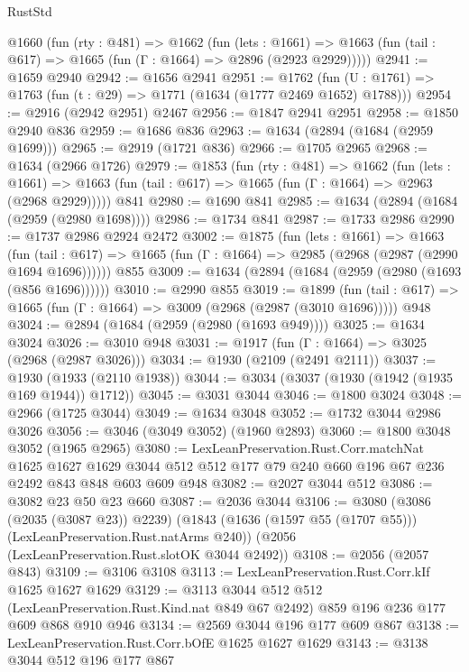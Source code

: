 \begin{lexlean}{RustStd}
\begin{coremodule}
  @1660
    (fun (rty : @481) =>
    @1662
      (fun (lets : @1661) =>
      @1663 (fun (tail : @617) => @1665 (fun (Γ : @1664) => @2896 (@2923 @2929)))))
@2941 := @1659 @2940
@2942 := @1656 @2941
@2951 := @1762 (fun (U : @1761) => @1763 (fun (t : @29) => @1771 (@1634 (@1777 @2469 @1652) @1788)))
@2954 := @2916 (@2942 @2951) @2467
@2956 := @1847 @2941 @2951
@2958 := @1850 @2940 @836
@2959 := @1686 @836
@2963 := @1634 (@2894 (@1684 (@2959 @1699)))
@2965 := @2919 (@1721 @836)
@2966 := @1705 @2965
@2968 := @1634 (@2966 @1726)
@2979 := @1853
    (fun (rty : @481) =>
    @1662
      (fun (lets : @1661) =>
      @1663 (fun (tail : @617) => @1665 (fun (Γ : @1664) => @2963 (@2968 @2929)))))
    @841
@2980 := @1690 @841
@2985 := @1634 (@2894 (@1684 (@2959 (@2980 @1698))))
@2986 := @1734 @841
@2987 := @1733 @2986
@2990 := @1737 @2986 @2924 @2472
@3002 := @1875
    (fun (lets : @1661) =>
    @1663
      (fun (tail : @617) => @1665 (fun (Γ : @1664) => @2985 (@2968 (@2987 (@2990 @1694 @1696))))))
    @855
@3009 := @1634 (@2894 (@1684 (@2959 (@2980 (@1693 (@856 @1696))))))
@3010 := @2990 @855
@3019 := @1899
    (fun (tail : @617) => @1665 (fun (Γ : @1664) => @3009 (@2968 (@2987 (@3010 @1696)))))
    @948
@3024 := @2894 (@1684 (@2959 (@2980 (@1693 @949))))
@3025 := @1634 @3024
@3026 := @3010 @948
@3031 := @1917 (fun (Γ : @1664) => @3025 (@2968 (@2987 @3026)))
@3034 := @1930 (@2109 (@2491 @2111))
@3037 := @1930 (@1933 (@2110 @1938))
@3044 := @3034 (@3037 (@1930 (@1942 (@1935 @169 @1944)) @1712))
@3045 := @3031 @3044
@3046 := @1800 @3024
@3048 := @2966 (@1725 @3044)
@3049 := @1634 @3048
@3052 := @1732 @3044 @2986 @3026
@3056 := @3046 (@3049 @3052) (@1960 @2893)
@3060 := @1800 @3048 @3052 (@1965 @2965)
@3080 := LexLeanPreservation.Rust.Corr.matchNat
    @1625
    @1627
    @1629
    @3044
    @512
    @512
    @177
    @79
    @240
    @660
    @196
    @67
    @236
    @2492
    @843
    @848
    @603
    @609
    @948
@3082 := @2027 @3044 @512
@3086 := @3082 @23 @50 @23 @660
@3087 := @2036 @3044
@3106 := @3080
    (@3086 (@2035 (@3087 @23)) @2239)
    (@1843 (@1636 (@1597 @55 (@1707 @55))) (LexLeanPreservation.Rust.natArms @240))
    (@2056 (LexLeanPreservation.Rust.slotOK @3044 @2492))
@3108 := @2056 (@2057 @843)
@3109 := @3106 @3108
@3113 := LexLeanPreservation.Rust.Corr.kIf @1625 @1627 @1629
@3129 := @3113
    @3044
    @512
    @512
    (LexLeanPreservation.Rust.Kind.nat @849 @67 @2492)
    @859
    @196
    @236
    @177
    @609
    @868
    @910
    @946
@3134 := @2569 @3044 @196 @177 @609 @867
@3138 := LexLeanPreservation.Rust.Corr.bOfE @1625 @1627 @1629
@3143 := @3138 @3044 @512 @196 @177 @867

\end{coremodule}
\end{lexlean}
